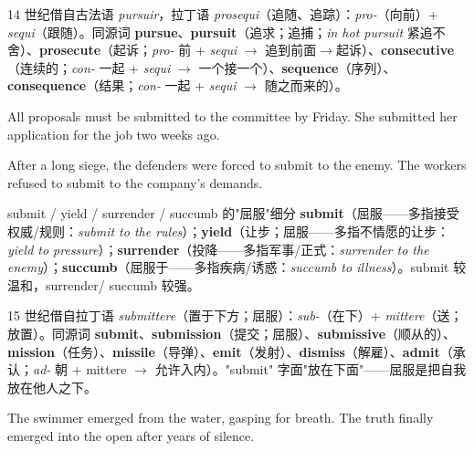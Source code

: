 \documentclass[../main.tex]{subfiles}
\begin{document}
\begin{origin}
14 世纪借自古法语 \textit{pursuir}，拉丁语 \textit{prosequi}（追随、追踪）：\textit{pro-}（向前）+ \textit{sequi}（跟随）。同源词 \textbf{pursue}、\textbf{pursuit}（追求；追捕；\textit{in hot pursuit} 紧追不舍）、\textbf{prosecute}（起诉；\textit{pro-} 前 + \textit{sequi} $\to$ 追到前面$\to$起诉）、\textbf{consecutive}（连续的；\textit{con-} 一起 + \textit{sequi} $\to$ 一个接一个）、\textbf{sequence}（序列）、\textbf{consequence}（结果；\textit{con-} 一起 + \textit{sequi} $\to$ 随之而来的）。
\end{origin}


{All proposals must be submitted to the committee by Friday.}
{She submitted her application for the job two weeks ago.}

{After a long siege, the defenders were forced to submit to the enemy.}
{The workers refused to submit to the company's demands.}

\begin{gram}{submit / yield / surrender / succumb 的"屈服"细分}
\textbf{submit}（屈服——多指接受权威/规则：\textit{submit to the rules}）；\textbf{yield}（让步；屈服——多指不情愿的让步：\textit{yield to pressure}）；\textbf{surrender}（投降——多指军事/正式：\textit{surrender to the enemy}）；\textbf{succumb}（屈服于——多指疾病/诱惑：\textit{succumb to illness}）。submit 较温和，surrender/ succumb 较强。
\end{gram}

\begin{origin}
15 世纪借自拉丁语 \textit{submittere}（置于下方；屈服）：\textit{sub-}（在下）+ \textit{mittere}（送；放置）。同源词 \textbf{submit}、\textbf{submission}（提交；屈服）、\textbf{submissive}（顺从的）、\textbf{mission}（任务）、\textbf{missile}（导弹）、\textbf{emit}（发射）、\textbf{dismiss}（解雇）、\textbf{admit}（承认；\textit{ad-} 朝 + mittere $\to$ 允许入内）。"submit" 字面"放在下面"——屈服是把自我放在他人之下。
\end{origin}


{The swimmer emerged from the water, gasping for breath.}
{The truth finally emerged into the open after years of silence.}
\end{document}

